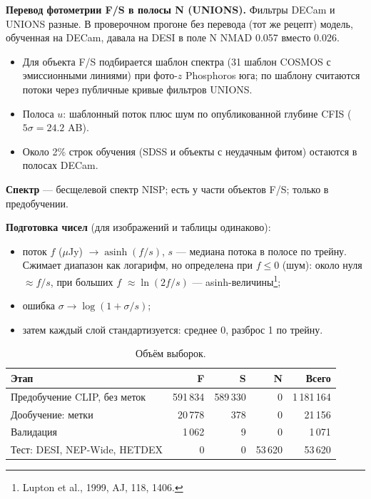 \documentclass[11pt,a4paper]{article}
\begin{document}
\textbf{Перевод фотометрии F/S в полосы N (UNIONS).} Фильтры DECam и UNIONS разные. В проверочном прогоне без перевода (тот же рецепт) модель, обученная на DECam, давала на DESI в поле N NMAD 0.057 вместо 0.026.
\begin{itemize}
  \item Для объекта F/S подбирается шаблон спектра (31 шаблон COSMOS с эмиссионными линиями) при фото-$z$ Phosphoros юга; по шаблону считаются потоки через публичные кривые фильтров UNIONS.
  \item Полоса $u$: шаблонный поток плюс шум по опубликованной глубине CFIS ($5\sigma=24.2$ AB).
  \item Около 2\% строк обучения (SDSS и объекты с неудачным фитом) остаются в полосах DECam.
\end{itemize}

\textbf{Спектр} — бесщелевой спектр NISP; есть у части объектов F/S; только в предобучении.

\textbf{Подготовка чисел} (для изображений и таблицы одинаково):
\begin{itemize}
  \item поток $f$ ($\mu$Jy) $\to\operatorname{asinh}(f/s)$, $s$ — медиана потока в полосе по трейну. Сжимает диапазон как логарифм, но определена при $f\le0$ (шум): около нуля $\approx f/s$, при больших $f$ $\approx\ln(2f/s)$ — asinh-величины\footnote{\label{fn:lupton}Lupton et al., 1999, AJ, 118, 1406.};
  \item ошибка $\sigma\to\log(1+\sigma/s)$;
  \item затем каждый слой стандартизуется: среднее 0, разброс 1 по трейну.
\end{itemize}

\begin{table}[H]
\centering\small
\caption{Объём выборок.}
\begin{tabular}{lrrrr}
\toprule
Этап & F & S & N & Всего \\
\midrule
Предобучение CLIP, без меток & 591\,834 & 589\,330 & 0 & 1\,181\,164 \\
Дообучение: метки & 20\,778 & 378 & 0 & 21\,156 \\
Валидация & 1\,062 & 9 & 0 & 1\,071 \\
Тест: DESI, NEP-Wide, HETDEX & 0 & 0 & 53\,620 & 53\,620 \\
\bottomrule
\end{tabular}
\end{table}
\end{document}
